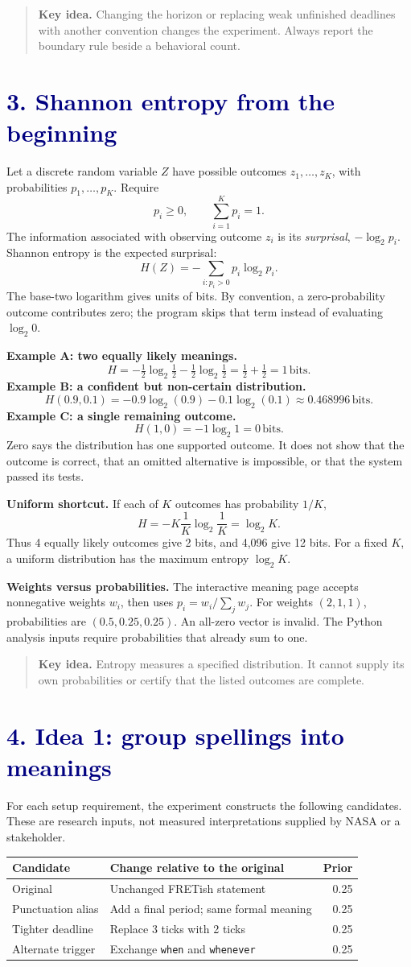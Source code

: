 \documentclass[11pt,a4paper]{article}
\newcommand{\lesson}[2]{\section*{\textcolor{navy}{#1. #2}}}
\newcommand{\key}[1]{\begin{quote}\color{teal}\textbf{Key idea.} #1\end{quote}}
\newcommand{\bits}{\,\mathrm{bits}}
\begin{document}
\key{Changing the horizon or replacing weak unfinished deadlines with another convention changes the experiment. Always report the boundary rule beside a behavioral count.}
\newpage

\lesson{3}{Shannon entropy from the beginning}
Let a discrete random variable \(Z\) have possible outcomes \(z_1,\ldots,z_K\), with probabilities \(p_1,\ldots,p_K\). Require
\[
p_i\geq0,\qquad \sum_{i=1}^{K}p_i=1.
\]
The information associated with observing outcome \(z_i\) is its \emph{surprisal}, \(-\log_2 p_i\). Shannon entropy is the expected surprisal:
\[
\boxed{H(Z)=-\sum_{i:p_i>0}p_i\log_2 p_i.}
\]
The base-two logarithm gives units of bits. By convention, a zero-probability outcome contributes zero; the program skips that term instead of evaluating \(\log_2 0\).

\textbf{Example A: two equally likely meanings.}
\[
H=-\tfrac12\log_2\tfrac12-\tfrac12\log_2\tfrac12
=\tfrac12+\tfrac12=1\bits.
\]
\textbf{Example B: a confident but non-certain distribution.}
\[
H(0.9,0.1)=-0.9\log_2(0.9)-0.1\log_2(0.1)
\approx0.468996\bits.
\]
\textbf{Example C: a single remaining outcome.}
\[
H(1,0)=-1\log_2 1=0\bits.
\]
Zero says the distribution has one supported outcome. It does not show that the outcome is correct, that an omitted alternative is impossible, or that the system passed its tests.

\textbf{Uniform shortcut.} If each of \(K\) outcomes has probability \(1/K\),
\[
H=-K\frac1K\log_2\frac1K=\log_2K.
\]
Thus 4 equally likely outcomes give 2 bits, and 4,096 give 12 bits. For a fixed \(K\), a uniform distribution has the maximum entropy \(\log_2 K\).

\textbf{Weights versus probabilities.} The interactive meaning page accepts nonnegative weights \(w_i\), then uses \(p_i=w_i/\sum_jw_j\). For weights \((2,1,1)\), probabilities are \((0.5,0.25,0.25)\). An all-zero vector is invalid. The Python analysis inputs require probabilities that already sum to one.

\key{Entropy measures a specified distribution. It cannot supply its own probabilities or certify that the listed outcomes are complete.}
\newpage

\lesson{4}{Idea 1: group spellings into meanings}
For each setup requirement, the experiment constructs the following candidates. These are research inputs, not measured interpretations supplied by NASA or a stakeholder.

\begin{center}
\begin{tabular}{p{34mm}p{76mm}r}
\toprule
Candidate & Change relative to the original & Prior\\\midrule
Original & Unchanged FRETish statement & 0.25\\
Punctuation alias & Add a final period; same formal meaning & 0.25\\
Tighter deadline & Replace 3 ticks with 2 ticks & 0.25\\
Alternate trigger & Exchange \texttt{when} and \texttt{whenever} & 0.25\\\bottomrule
\end{tabular}
\end{center}
\end{document}
